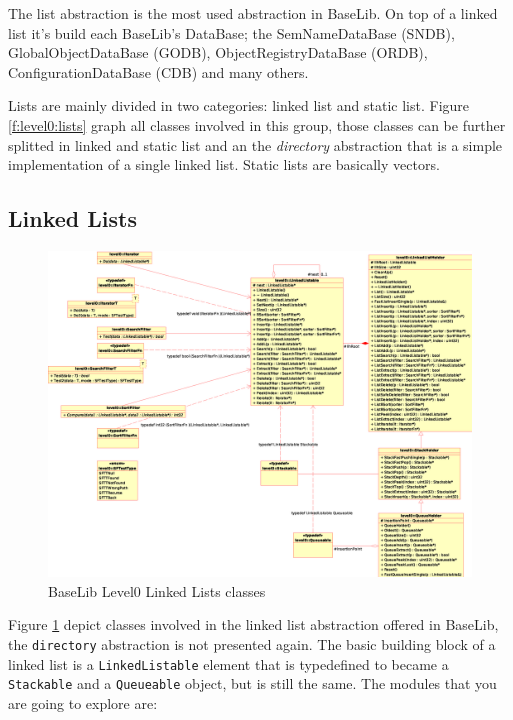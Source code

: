 The list abstraction is the most used abstraction in BaseLib. On top of a linked list it's build each BaseLib's DataBase; the SemNameDataBase (SNDB), GlobalObjectDataBase (GODB), ObjectRegistryDataBase (ORDB), ConfigurationDataBase (CDB) and many others.

Lists are mainly divided in two categories: linked list and static list. Figure \ref{f:level0:lists} graph all classes involved in this group, those classes can be further splitted in linked and static list and an the \textit{directory} abstraction that is a simple implementation of a single linked list. Static lists are basically vectors.



\subsection{Linked Lists}
\begin{figure}[h!]
 \begin{center}
  \includegraphics[width=\textwidth]{level0/level0-linked.eps}
  \caption{BaseLib Level0 Linked Lists classes}
  \label{f:level0:linked}
 \end{center}
\end{figure}

Figure \ref{f:level0:linked} depict classes involved in the linked list abstraction offered in BaseLib, the \texttt{directory} abstraction is not presented again. The basic building block of a linked list is a \texttt{LinkedListable} element that is typedefined to became a \texttt{Stackable} and a \texttt{Queueable} object, but is still the same. The modules that you are going to explore are:

